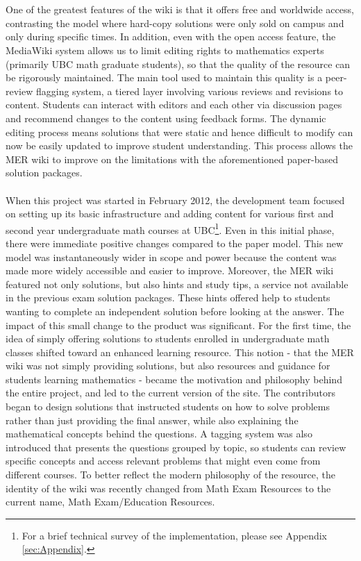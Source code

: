 \documentclass{primus}
\begin{document}
\\\\
\noindent{}One of the greatest features of the wiki is that it offers free and worldwide access, contrasting the model where hard-copy solutions were only sold on campus and only during specific times. In addition, even with the open access feature, the MediaWiki system allows us to limit editing rights to mathematics experts (primarily UBC math graduate students), so that the quality of the resource can be rigorously maintained. The main tool  used to maintain this quality is a peer-review flagging system, a tiered layer involving various reviews and revisions to content. Students can interact with editors and each other via discussion pages and recommend changes to the content using feedback forms. The dynamic editing process means solutions that were static and hence difficult to modify can now be easily updated to improve student understanding. This process allows the MER wiki to improve on the limitations with the aforementioned paper-based solution packages.
\\\\
\noindent{}When this project was started in February 2012, the development team focused on setting up its basic infrastructure and adding content for various first and second year undergraduate math courses at UBC\footnote{For a brief technical survey of the implementation, please see Appendix \ref{sec:Appendix}.
}. Even in this initial phase, there were immediate positive changes compared to the paper model. This new model was instantaneously wider in scope and power because the content was made more widely accessible and easier to improve. Moreover, the MER wiki featured not only solutions, but also hints and study tips, a service not available in the previous exam solution packages. These hints offered help to students wanting to complete an independent solution before looking at the answer. The impact of this small change to the product was significant. For the first time, the idea of simply offering solutions to students enrolled in undergraduate math classes shifted toward an enhanced learning resource.
This notion - that the MER wiki was not simply providing solutions, but also resources and guidance for students learning mathematics - became the motivation and philosophy behind the entire project, and led to the current version of the site. The contributors began to design solutions that instructed students on how to solve problems rather than just providing the final answer, while also explaining the mathematical concepts behind the questions. A tagging system was also introduced that presents the questions grouped by topic, so students can review specific concepts and access relevant problems that might even come from different courses. To better reflect the modern philosophy of the resource, the identity of the wiki was recently changed from Math Exam Resources to the current name, Math Exam/Education Resources.
\end{document}
